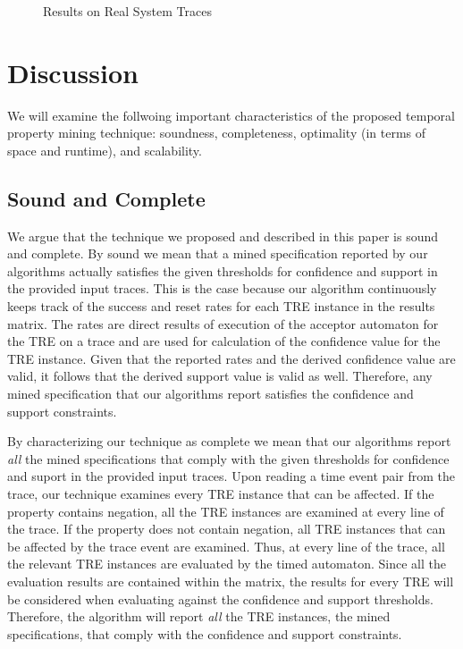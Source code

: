\documentclass[]{sigplanconf}
\begin{document}
\begin{figure}[ht]
  \centering
  \caption{Results on Real System Traces}\label{Algs_real}
\end{figure}

\section{Discussion} \label{discussion}

We will examine the follwoing important characteristics of the proposed temporal property mining technique: soundness, completeness, optimality (in terms of space and runtime), and scalability.


\subsection{Sound and Complete}

We argue that the technique we proposed and described in this paper is sound and complete. By sound we mean that a mined specification reported by our algorithms actually satisfies the given thresholds for confidence and support in the provided input traces. This is the case because our algorithm continuously keeps track of the success and reset rates for each TRE instance in the results matrix. The rates are direct results of execution of the acceptor automaton for the TRE on a trace and are used for calculation of the confidence value for the TRE instance. Given that the reported rates and the derived confidence value are valid, it follows that the derived support value is valid as well. Therefore, any mined specification that our algorithms report satisfies the confidence and support constraints.

By characterizing our technique as complete we mean that our algorithms report \emph{all} the mined specifications that comply with the given thresholds for confidence and suport in the provided input traces. Upon reading a time event pair from the trace, our technique examines every TRE instance that can be affected. If the property contains negation, all the TRE instances are examined at every line of the trace. If the property does not contain negation, all TRE instances that can be affected by the trace event are examined. Thus, at every line of the trace, all the relevant TRE instances are evaluated by the timed automaton. Since all the evaluation results are contained within the matrix, the results for every TRE will be considered when evaluating against the confidence and support thresholds. Therefore, the algorithm will report \emph{all} the TRE instances, the mined specifications, that comply with the confidence and support constraints.
\end{document}
